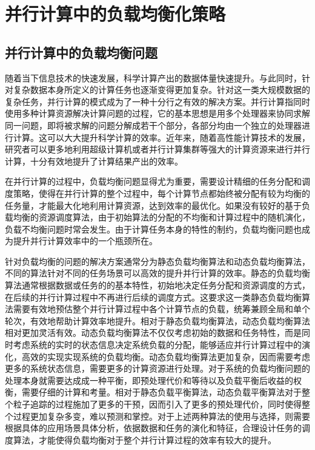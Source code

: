 \section{并行计算中的负载均衡化策略}

\subsection{并行计算中的负载均衡问题}
随着当下信息技术的快速发展，科学计算产出的数据体量快速提升。与此同时，针对复杂数据本身所定义的计算任务也逐渐变得更加复杂。针对这一类大规模数据的复杂任务，并行计算的模式成为了一种十分行之有效的解决方案。并行计算指同时使用多种计算资源解决计算问题的过程，它的基本思想是用多个处理器来协同求解同一问题，即将被求解的问题分解成若干个部分，各部分均由一个独立的处理器进行计算。这可以大大提升科学计算的效率。近年来，随着高性能计算技术的发展，研究者可以更多地利用超级计算机或者并行计算集群等强大的计算资源来进行并行计算，十分有效地提升了计算结果产出的效率。

在并行计算的过程中，负载均衡问题显得尤为重要，需要设计精细的任务分配和调度策略，使得在并行计算的整个过程中，每个计算节点都始终被分配有较为均衡的任务量，才能最大化地利用计算资源，达到效率的最优化。如果没有较好的基于负载均衡的资源调度算法，由于初始算法的分配的不均衡和计算过程中的随机演化，负载不均衡问题时常会发生。由于计算任务本身的特性的制约，负载均衡问题也成为提升并行计算效率中的一个瓶颈所在。

针对负载均衡的问题的解决方案通常分为静态负载均衡算法和动态负载均衡算法，不同的算法针对不同的任务场景可以高效的提升并行计算的效率。静态的负载均衡算法通常根据数据或任务的的基本特性，初始地决定任务分配和资源调度的方式，在后续的并行计算过程中不再进行后续的调度方式。这要求这一类静态负载均衡算法需要有效地预估整个并行计算过程中各个计算节点的负载，统筹兼顾全局和单个轮次，有效地帮助计算效率地提升。相对于静态负载均衡算法，动态负载均衡算法相对更加灵活有效。动态负载均衡算法不仅仅考虑初始的数据和任务特性，而是同时考虑系统的实时的状态信息决定系统负载的分配，能够适应并行计算过程中的演化，高效的实现实现系统的负载均衡。动态负载均衡算法更加复杂，因而需要考虑更多的系统状态信息，需要更多的计算资源进行处理。对于系统的负载均衡问题的处理本身就需要达成成一种平衡，即预处理代价和等待以及负载平衡后收益的权衡，需要仔细的计算和考量。相对于静态负载平衡算法，动态负载平衡算法对于整个粒子追踪的过程施加了更多的干预，因而引入了更多的预处理代价，同时使得整个过程更加复杂多变，难以预测和掌控。对于上述两种算法的使用与选择，则需要根据具体的应用场景具体分析，依据数据和任务的演化和特征，合理设计任务的调度算法，才能使得负载均衡对于整个并行计算过程的效率有较大的提升。

